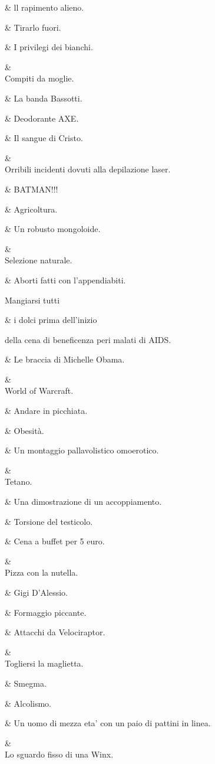 &
ll rapimento
alieno.

&
Tirarlo fuori.

&
I privilegi dei
bianchi.

&
\\
Compiti da
moglie.

&
La banda
Bassotti.

&
Deodorante AXE.

&
Il sangue di
Cristo.

&
\\
Orribili incidenti
dovuti alla
depilazione laser.

&
BATMAN!!!

&
Agricoltura.

&
Un robusto
mongoloide.

&
\\
Selezione
naturale.

&
Aborti fatti con
l’appendiabiti.

Mangiarsi tutti

&
i dolci prima
dell’inizio

della cena di
beneficenza peri
malati di AIDS.

&
Le braccia di
Michelle Obama.

&
\\
World of
Warcraft.

&
Andare in
picchiata.

&
Obesità.

&
Un montaggio
pallavolistico
omoerotico.

&
\\
Tetano.

&
Una
dimostrazione
di un
accoppiamento.

&
Torsione del
testicolo.

&
Cena a buffet per
5 euro.

&
\\
Pizza con la
nutella.

&
Gigi D’Alessio.

&
Formaggio
piccante.

&
Attacchi da
Velociraptor.

&
\\
Togliersi la
maglietta.

&
Smegma.

&
Alcolismo.

&
Un uomo di
mezza eta’ con
un paio di pattini
in linea.

&
\\
Lo sguardo fisso
di una Winx.

